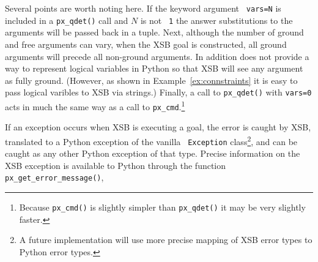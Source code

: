 \begin{example}
Several points are worth noting here.  If the keyword argument {\tt
  vars=N} is included in a {\tt px\_qdet()} call and $N$ is not {\tt
  1} the answer substitutions to the arguments will be passed back in
a tuple.  Next, although the number of ground and free arguments can
vary, when the XSB goal is constructed, all ground arguments will
precede all non-ground arguments.  In addition \px{} does not provide
a way to represent logical variables in Python so that XSB will see
any argument as fully ground.  (However, as shown in Example~\ref{ex:connstraints} it
is easy to pass logical varibles to XSB via strings.)  Finally, a
call to {\tt px\_qdet()} with {\tt vars=0} acts in much the same way
as a call to {\tt px\_cmd}.\footnote{Because {\tt px\_cmd()} is
  slightly simpler than {\tt px\_qdet()} it may be very slightly
  faster.}
\end{example}

If an exception occurs when XSB is executing a goal, the error is
caught by XSB, translated to a Python exception of the vanilla {\tt
  Exception} class\footnote{A future implementation will use more
  precise mapping of XSB error types to Python error types.}, and can
be caught as any other Python exception of that type.  Precise
information on the XSB exception is available to Python through the
\px{} function {\tt px\_get\_error\_message()},

